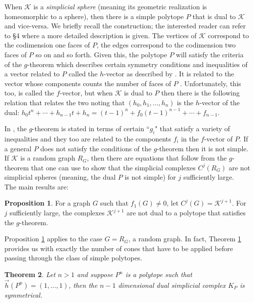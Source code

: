 \documentclass[oneside,12pt]{amsart}
\newtheorem{Theorem}{Theorem}[section]
\theoremstyle{definition}
\newtheorem{Proposition}[Theorem]{Proposition}
\numberwithin{equation}{section}
\begin{document}
When $\mathcal{K}$ is a \textit{simplicial sphere} (meaning its geometric realization is homeomorphic to a sphere), then there is a simple polytope $P$ that is dual to $\mathcal{K}$ and vice-versa.  We briefly recall the construction; the interested reader can refer to \S4 where a more detailed description is given.  The vertices of $\mathcal{K}$ correspond to the codimension one faces of $P$, the edges correspond to the codimension two faces of $P$ so on and so forth. Given this, the polytope $P$ will satisfy the criteria of the $g$-theorem which describes certain symmetry conditions and inequalities of a vector related to $P$ called the $h$-vector as described by \cite{BP1}. It is related to the vector whose components counts the number of faces of $P$ \cite{BP1}.  Unfortunately, this too, is called the $f$-vector, but when $\mathcal{K}$ is dual to $P$ then there is the following relation that relates the two noting that $(h_0, h_1,\ldots,h_n)$ is the $h$-vector of the dual:  $h_0t^n + \cdots+ h_{n-1}t + h_n  = (t-1)^n + f_0(t-1)^{n-1} + \cdots + f_{n-1}$.

In \cite{B}, the $g$-theorem is stated in terms of certain ``$g_i$" that satisfy a variety of inequalities and they too are related to the components $f_i$ in the $f$-vector of $P$.  If a general $P$ does not satisfy the conditions of the $g$-theorem then it is not simple.  If $\mathcal{K}$ is a random graph $R_G$, then there are equations that follow from the $g$-theorem that one can use to show that the simplicial complexes $C^j(R_G)$ are not simplicial spheres (meaning, the dual $P$ is not simple) for $j$ sufficiently large.\\[.5ex]

The main results are:

\begin{Proposition}\label{No g Theorem}
For a graph $G$ such that $f_1(G) \neq 0$, let $C^{j}(G) = \mathcal{K}^{j+1}$. For $j$ sufficiently large, the complexes $\mathcal{K}^{j+1}$ are not dual to a polytope that satisfies the $g$-theorem.
\end{Proposition}

Proposition \ref{No g Theorem} applies to the case $G = R_G$, a random graph.  In fact, Theorem \ref{No g Theorem} provides us with exactly the number of cones that have to be applied before passing through the class of simple polytopes.
\begin{Theorem} \label{N simplex}
Let $n >1$ and suppose $P^n$ is a polytope such that $\overrightarrow{h}(P^n) = (1,\ldots,1)$, then the $n-1$ dimensional dual simplicial complex $K_P$ is symmetrical.  %
\end{Theorem}
\end{document}
